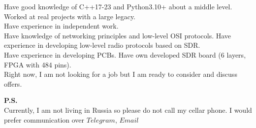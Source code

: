 

\begin{cvparagraph}


\begin{flushleft}
    Have good knowledge of C++17-23 and Python3.10+ about a middle level.\\
    Worked at real projects with a large legacy.\\
    Have experience in independent work.\\
    Have knowledge of networking principles and low-level OSI protocols. Have experience in developing low-level radio protocols based on SDR.\\
    Have experience in developing PCBs. Have own developed SDR board (6 layers, FPGA with 484 pins).\\
    Right now, I am not looking for a job but I am ready to consider and discuss offers.\\
\end{flushleft}
\begin{flushleft}
    \textbf{P.S.}\\
    Currently, I am not living in Russia so please do not call my cellar phone. I would prefer communication over $Telegram$, $Email$
\end{flushleft}
\end{cvparagraph}